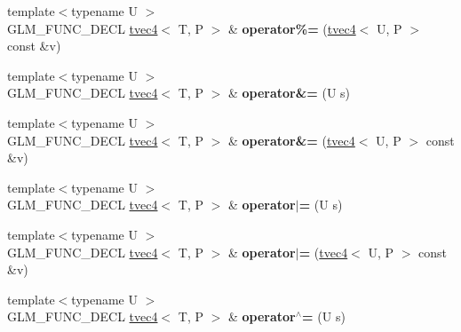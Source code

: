 \begin{DoxyCompactItemize}
\item 
{\footnotesize template$<$typename U $>$ }\\G\+L\+M\+\_\+\+F\+U\+N\+C\+\_\+\+D\+E\+CL \hyperlink{structglm_1_1detail_1_1tvec4}{tvec4}$<$ T, P $>$ \& {\bfseries operator\%=} (\hyperlink{structglm_1_1detail_1_1tvec4}{tvec4}$<$ U, P $>$ const \&v)\hypertarget{structglm_1_1detail_1_1tvec4_a9ab6bbc0aa973f884a5d4e95230fddba}{}\label{structglm_1_1detail_1_1tvec4_a9ab6bbc0aa973f884a5d4e95230fddba}

\item 
{\footnotesize template$<$typename U $>$ }\\G\+L\+M\+\_\+\+F\+U\+N\+C\+\_\+\+D\+E\+CL \hyperlink{structglm_1_1detail_1_1tvec4}{tvec4}$<$ T, P $>$ \& {\bfseries operator\&=} (U s)\hypertarget{structglm_1_1detail_1_1tvec4_a4b82149d9b97976d59c763ae1e9a2ad9}{}\label{structglm_1_1detail_1_1tvec4_a4b82149d9b97976d59c763ae1e9a2ad9}

\item 
{\footnotesize template$<$typename U $>$ }\\G\+L\+M\+\_\+\+F\+U\+N\+C\+\_\+\+D\+E\+CL \hyperlink{structglm_1_1detail_1_1tvec4}{tvec4}$<$ T, P $>$ \& {\bfseries operator\&=} (\hyperlink{structglm_1_1detail_1_1tvec4}{tvec4}$<$ U, P $>$ const \&v)\hypertarget{structglm_1_1detail_1_1tvec4_a5d0cba98ee74428170a8be161735f0e4}{}\label{structglm_1_1detail_1_1tvec4_a5d0cba98ee74428170a8be161735f0e4}

\item 
{\footnotesize template$<$typename U $>$ }\\G\+L\+M\+\_\+\+F\+U\+N\+C\+\_\+\+D\+E\+CL \hyperlink{structglm_1_1detail_1_1tvec4}{tvec4}$<$ T, P $>$ \& {\bfseries operator$\vert$=} (U s)\hypertarget{structglm_1_1detail_1_1tvec4_a9841c9154372e67d5d6e0b459848ca86}{}\label{structglm_1_1detail_1_1tvec4_a9841c9154372e67d5d6e0b459848ca86}

\item 
{\footnotesize template$<$typename U $>$ }\\G\+L\+M\+\_\+\+F\+U\+N\+C\+\_\+\+D\+E\+CL \hyperlink{structglm_1_1detail_1_1tvec4}{tvec4}$<$ T, P $>$ \& {\bfseries operator$\vert$=} (\hyperlink{structglm_1_1detail_1_1tvec4}{tvec4}$<$ U, P $>$ const \&v)\hypertarget{structglm_1_1detail_1_1tvec4_a6e487f3a13cff94c633d2f4961f8d82a}{}\label{structglm_1_1detail_1_1tvec4_a6e487f3a13cff94c633d2f4961f8d82a}

\item 
{\footnotesize template$<$typename U $>$ }\\G\+L\+M\+\_\+\+F\+U\+N\+C\+\_\+\+D\+E\+CL \hyperlink{structglm_1_1detail_1_1tvec4}{tvec4}$<$ T, P $>$ \& {\bfseries operator$^\wedge$=} (U s)\hypertarget{structglm_1_1detail_1_1tvec4_ade267c789e5e2fa64194f676fbede6d3}{}\label{structglm_1_1detail_1_1tvec4_ade267c789e5e2fa64194f676fbede6d3}


\end{DoxyCompactItemize}
